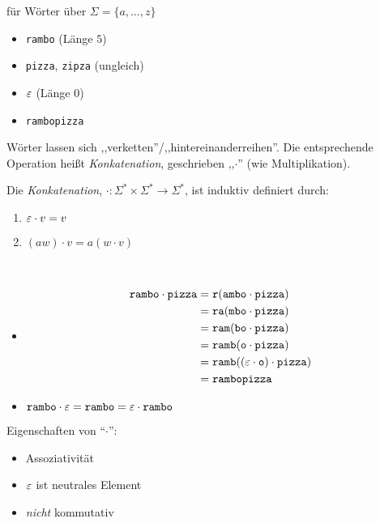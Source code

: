 \goodbreak

\begin{Bsp*} für Wörter über $\Sigma=\{a,\dots,z\}$
  \begin{itemize}
  \item \verb/rambo/ (Länge $5$)
  \item \verb/pizza/, \verb/zipza/ (ungleich) 
  \item $\varepsilon$ (Länge $0$)
  \item \verb/rambopizza/
  \end{itemize}
\end{Bsp*}
Wörter lassen sich ,,verketten''/,,hintereinanderreihen''.
Die entsprechende Operation heißt \emph{Konkatenation}, geschrieben ,,$\cdot$'' (wie Multiplikation).
\begin{Def}
  Die \emph{Konkatenation}, $\mathord{\cdot} : \Sigma^* \times \Sigma^* \to \Sigma^*$, ist induktiv definiert durch:
  \begin{enumerate}
  \item $\varepsilon\cdot v = v$
  \item $(aw)\cdot v = a(w\cdot v)$
  \end{enumerate}
\end{Def}
\begin{Bsp*} ~
  \begin{itemize}
  \item \begin{align*}\mathtt{rambo}\cdot\mathtt{pizza} &=\mathtt{r(ambo}\cdot\mathtt{pizza})\\
                                                        &=\mathtt{ra(mbo}\cdot\mathtt{pizza})\\
                                                        &=\mathtt{ram(bo}\cdot\mathtt{pizza})\\
                                                        &=\mathtt{ramb(o}\cdot\mathtt{pizza})\\
                                                        &=\mathtt{ramb((\varepsilon\cdot o)}\cdot\mathtt{pizza})\\
                                                        &=\mathtt{rambopizza}
        \end{align*}
  \item $\mathtt{rambo} \cdot \varepsilon = \mathtt{rambo} = \varepsilon \cdot \mathtt{rambo}$ 
  \end{itemize}
\end{Bsp*}
Eigenschaften von "`$\cdot$"':
\begin{itemize}
\item Assoziativität
\item $\varepsilon$ ist neutrales Element
\item \emph{nicht} kommutativ
\end{itemize}
